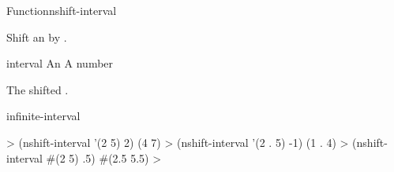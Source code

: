 \documentclass[10pt,twoside,english,pdftex]{article}
\begin{document}
\begin{functiondoc}{Function}{nshift-interval}%
  {
    }
%
%

\fnsyntax

\fnpurpose Shift an  by .

\fnpackage {}

\fnmodule {}

\fnargs
\begin{args}{interval}
\arg[interval] An 
\arg[amount] A number
\end{args}

\fnreturns The shifted .

\begin{alsos}{infinite-interval}
\end{alsos}

\fnexamples
%
\W\supp
\begin{example}
  > (nshift-interval '(2 5) 2)
  (4 7)
  > (nshift-interval '(2 . 5) -1)
  (1 . 4)
  > (nshift-interval #(2 5) .5)
  #(2.5 5.5)
  >
\end{example}

\end{functiondoc}

\end{document}

